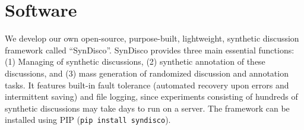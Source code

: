 \section{Software}

We develop our own open-source, purpose-built, lightweight, synthetic discussion framework called “SynDisco”. SynDisco provides three main essential functions: (1) Managing of synthetic discussions, (2) synthetic annotation of these discussions, and (3) mass generation of randomized discussion and annotation tasks. It features built-in fault tolerance (automated recovery upon errors and intermittent saving) and file logging, since experiments consisting of hundreds of synthetic discussions may take days to run on a server. The framework can be installed using PIP (\texttt{pip install  syndisco}).

